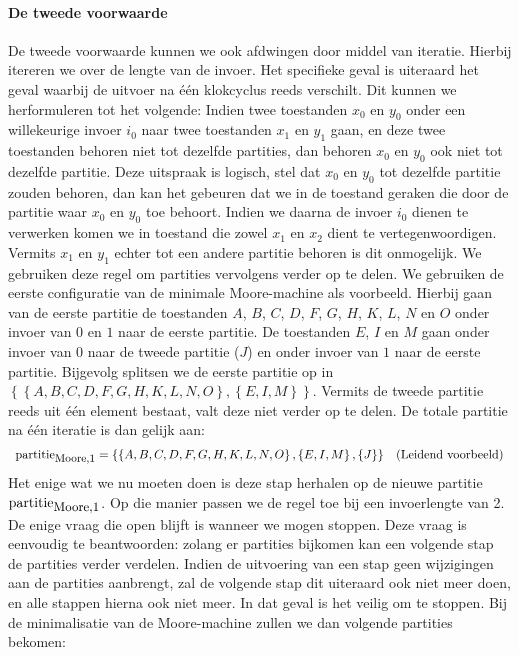 \paragraph{De tweede voorwaarde}De tweede voorwaarde kunnen we ook afdwingen door middel van iteratie. Hierbij itereren we over de lengte van de invoer. Het specifieke geval is uiteraard het geval waarbij de uitvoer na \'e\'en klokcyclus reeds verschilt. Dit kunnen we herformuleren tot het volgende: Indien twee toestanden $x_0$ en $y_0$ onder een willekeurige invoer $i_0$ naar twee toestanden $x_1$ en $y_1$ gaan, en deze twee toestanden behoren niet tot dezelfde partities, dan behoren $x_0$ en $y_0$ ook niet tot dezelfde partitie. Deze uitspraak is logisch, stel dat $x_0$ en $y_0$ tot dezelfde partitie zouden behoren, dan kan het gebeuren dat we in de toestand geraken die door de partitie waar $x_0$ en $y_0$ toe behoort. Indien we daarna de invoer $i_0$ dienen te verwerken komen we in toestand die zowel $x_1$ en $x_2$ dient te vertegenwoordigen. Vermits $x_1$ en $y_1$ echter tot een andere partitie behoren is dit onmogelijk. We gebruiken deze regel om partities vervolgens verder op te delen. We gebruiken de eerste configuratie van de minimale Moore-machine als voorbeeld. Hierbij gaan van de eerste partitie de toestanden $A$, $B$, $C$, $D$, $F$, $G$, $H$, $K$, $L$, $N$ en $O$ onder invoer van $0$ en $1$ naar de eerste partitie. De toestanden $E$, $I$ en $M$ gaan onder invoer van $0$ naar de tweede partitie ($J$) en onder invoer van $1$ naar de eerste partitie. Bijgevolg splitsen we de eerste partitie op in $\left\{\left\{A,B,C,D,F,G,H,K,L,N,O\right\},\left\{E,I,M\right\}\right\}$. Vermits de tweede partitie reeds uit \'e\'en element bestaat, valt deze niet verder op te delen. De totale partitie na \'e\'en iteratie is dan gelijk aan:
\begin{equation}
\begin{array}{lr}
\mbox{partitie}_{\mbox{\small{Moore,1}}}=\left\{\left\{A,B,C,D,F,G,H,K,L,N,O\right\},\left\{E,I,M\right\},\left\{J\right\}\right\}&\mbox{(Leidend voorbeeld)}
\end{array}
\end{equation}
Het enige wat we nu moeten doen is deze stap herhalen op de nieuwe partitie $\mbox{partitie}_{\mbox{\small{Moore,1}}}$. Op die manier passen we de regel toe bij een invoerlengte van 2. De enige vraag die open blijft is wanneer we mogen stoppen. Deze vraag is eenvoudig te beantwoorden: zolang er partities bijkomen kan een volgende stap de partities verder verdelen. Indien de uitvoering van een stap geen wijzigingen aan de partities aanbrengt, zal de volgende stap dit uiteraard ook niet meer doen, en alle stappen hierna ook niet meer. In dat geval is het veilig om te stoppen. Bij de minimalisatie van de Moore-machine zullen we dan volgende partities bekomen:
